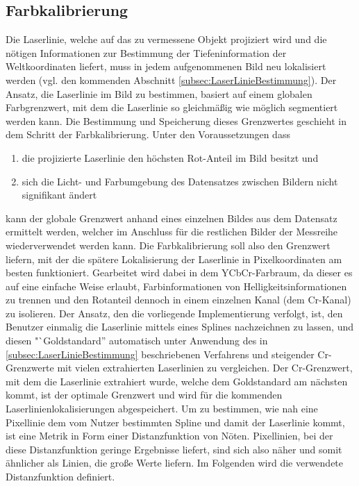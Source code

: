 \subsection{Farbkalibrierung}
\label{subsec:Farbkalibrierung}
Die Laserlinie, welche auf das zu vermessene Objekt projiziert wird und die nötigen Informationen zur Bestimmung der Tiefeninformation der Weltkoordinaten liefert, muss in jedem aufgenommenen Bild neu lokalisiert werden (vgl. den kommenden Abschnitt \ref{subsec:LaserLinieBestimmung}). Der Ansatz, die Laserlinie im Bild zu bestimmen, basiert auf einem globalen Farbgrenzwert, mit dem die Laserlinie so gleichmäßig wie möglich segmentiert werden kann. Die Bestimmung und Speicherung dieses Grenzwertes geschieht in dem Schritt der Farbkalibrierung. Unter den Voraussetzungen dass 
\begin{enumerate}
\item die projizierte Laserlinie den höchsten Rot-Anteil im Bild besitzt und 
\item sich die Licht- und Farbumgebung des Datensatzes zwischen Bildern nicht signifikant ändert
\end{enumerate} 
kann der globale Grenzwert anhand eines einzelnen Bildes aus dem Datensatz ermittelt werden, welcher im Anschluss für die restlichen Bilder der Messreihe wiederverwendet werden kann. \newline
Die Farbkalibrierung soll also den Grenzwert liefern, mit der die spätere Lokalisierung der Laserlinie in Pixelkoordinaten am besten funktioniert. Gearbeitet wird dabei in dem YCbCr-Farbraum, da dieser es auf eine einfache Weise erlaubt, Farbinformationen von Helligkeitsinformationen zu trennen und den Rotanteil dennoch in einem einzelnen Kanal (dem Cr-Kanal) zu isolieren. Der Ansatz, den die vorliegende Implementierung verfolgt, ist, den Benutzer einmalig die Laserlinie mittels eines Splines nachzeichnen zu lassen, und diesen "`Goldstandard'' automatisch unter Anwendung des in \ref{subsec:LaserLinieBestimmung} beschriebenen Verfahrens und steigender Cr-Grenzwerte mit vielen extrahierten Laserlinien zu vergleichen. Der Cr-Grenzwert, mit dem die Laserlinie extrahiert wurde, welche dem Goldstandard am nächsten kommt, ist der optimale Grenzwert und wird für die kommenden Laserlinienlokalisierungen abgespeichert.\bigbreak
Um zu bestimmen, wie nah eine Pixellinie dem vom Nutzer bestimmten Spline und damit der Laserlinie kommt, ist eine Metrik in Form einer Distanzfunktion von Nöten. Pixellinien, bei der diese Distanzfunktion geringe Ergebnisse liefert, sind sich also 
näher und somit ähnlicher als Linien, die große Werte liefern. Im Folgenden wird die verwendete Distanzfunktion definiert.\newline
